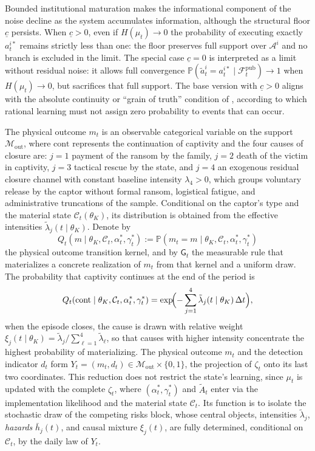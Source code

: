 \documentclass[review,authoryear,12pt]{elsarticle}
\theoremstyle{plain}
\theoremstyle{definition}
\newcommand{\Prob}{\mathbb{P}}
\newcommand{\1}{\mathbf{1}}
\begin{document}
Bounded institutional maturation makes the informational component of the noise decline as the system accumulates information, although the structural floor $\underline{c}$ persists. When $\underline{c}>0$, even if $H(\mu_t)\to 0$ the probability of executing exactly $a_t^{i\ast}$ remains strictly less than one: the floor preserves full support over $\mathcal{A}^i$ and no branch is excluded in the limit. The special case $\underline{c}=0$ is interpreted as a limit without residual noise: it allows full convergence $\Prob(\tilde{a}_t^i=a_t^{i\ast}\mid\mathcal{F}_t^{\mathrm{pub}})\to 1$ when $H(\mu_t)\to 0$, but sacrifices that full support. The base version with $\underline{c}>0$ aligns with the absolute continuity or ``grain of truth'' condition of \citet{KalaiLehrer1993}, according to which rational learning must not assign zero probability to events that can occur.

The physical outcome $m_t$ is an observable categorical variable on the support $\mathcal{M}_{\mathrm{out}}$, where $\mathrm{cont}$ represents the continuation of captivity and the four causes of closure are: $j=1$ payment of the ransom by the family, $j=2$ death of the victim in captivity, $j=3$ tactical rescue by the state, and $j=4$ an exogenous residual closure channel with constant baseline intensity $\lambda_4>0$, which groups voluntary release by the captor without formal ransom, logistical fatigue, and administrative truncations of the sample. Conditional on the captor's type and the material state $\mathcal{C}_t(\theta_K)$, its distribution is obtained from the effective intensities $\tilde{\lambda}_j(t\mid\theta_K)$. Denote by
\[
Q_t(m\mid\theta_K,\mathcal{C}_t,\alpha_t^\ast,\gamma_t^\ast)
:=\Prob(m_t=m\mid\theta_K,\mathcal{C}_t,\alpha_t^\ast,\gamma_t^\ast)
\]
the physical outcome transition kernel, and by $\mathsf{G}_t$ the measurable rule that materializes a concrete realization of $m_t$ from that kernel and a uniform draw. The probability that captivity continues at the end of the period is
\[
Q_t(\mathrm{cont}\mid\theta_K,\mathcal{C}_t,\alpha_t^\ast,\gamma_t^\ast)=\exp\!\Bigl(-\sum_{j=1}^{4}\tilde{\lambda}_j(t\mid\theta_K)\,\Delta t\Bigr),
\]
when the episode closes, the cause is drawn with relative weight $\xi_j(t\mid\theta_K)=\tilde{\lambda}_j/\sum_{\ell=1}^{4}\tilde{\lambda}_\ell$, so that causes with higher intensity concentrate the highest probability of materializing. The physical outcome $m_t$ and the detection indicator $d_t$ form $Y_t=(m_t,d_t)\in\mathcal{M}_{\mathrm{out}}\times\{0,1\}$, the projection of $\zeta_t$ onto its last two coordinates. This reduction does not restrict the state's learning, since $\mu_t$ is updated with the complete $\zeta_t$, where $(\alpha_t^\ast,\gamma_t^\ast)$ and $\tilde{A}_t$ enter via the implementation likelihood and the material state $\mathcal{C}_t$. Its function is to isolate the stochastic draw of the competing risks block, whose central objects, intensities $\tilde{\lambda}_j$, \textit{hazards} $\bar{h}_j(t)$, and causal mixture $\xi_j(t)$, are fully determined, conditional on $\mathcal{C}_t$, by the daily law of $Y_t$.
\end{document}
